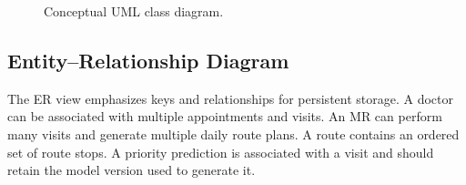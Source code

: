 \documentclass[12pt,a4paper,oneside]{report}
\begin{document}
\begin{figure}[htbp]
{}
\caption{Conceptual UML class diagram.}
\label{fig:class-diagram}
\end{figure}

\subsection{Entity--Relationship Diagram}
The ER view emphasizes keys and relationships for persistent storage. A doctor can be associated with multiple appointments and visits. An MR can perform many visits and generate multiple daily route plans. A route contains an ordered set of route stops. A priority prediction is associated with a visit and should retain the model version used to generate it.
\end{document}
